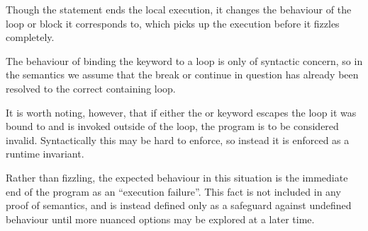 Though the statement ends the local execution, it changes the behaviour of the loop
or block it corresponds to, which picks up the execution before it fizzles completely.

The behaviour of binding the keyword to a loop is only of syntactic concern, so in the
semantics we assume that the break or continue in question has already been resolved to
the correct containing loop.

\begin{prooftree}
\end{prooftree}

\begin{prooftree}
\end{prooftree}

\begin{prooftree}
\end{prooftree}

It is worth noting, however, that if either the  or  keyword escapes the
loop it was bound to and is invoked outside of the loop, the program is to be considered invalid.
Syntactically this may be hard to enforce, so instead it is enforced as a runtime invariant.

Rather than fizzling, the expected behaviour in this situation is the immediate end of the
program as an ``execution failure''. This fact is not included in any proof of semantics,
and is instead defined only as a safeguard against undefined behaviour until more nuanced
options may be explored at a later time.
